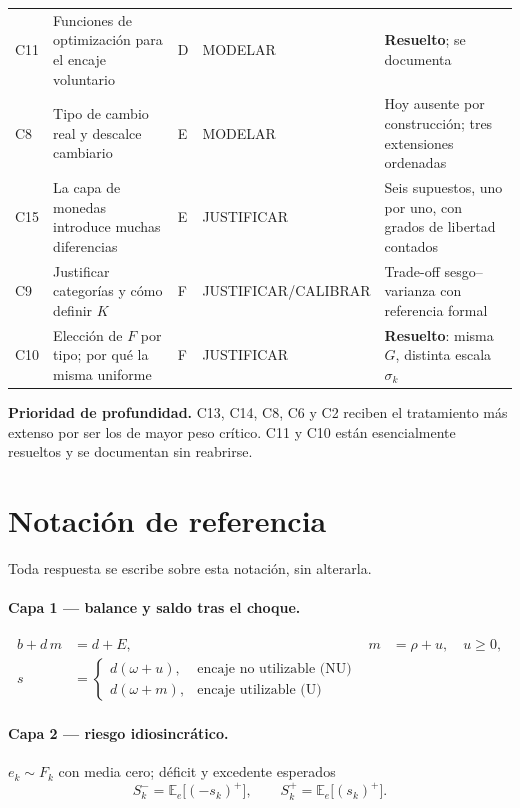 \documentclass[11pt]{article}
\newcommand{\E}{\mathbb{E}}
\theoremstyle{definition}
\begin{document}
\begin{longtable}{@{}p{0.6cm}p{5.6cm}p{1.3cm}p{2.5cm}p{4.2cm}@{}}
C11 & Funciones de optimizaci\'on para el encaje voluntario & D & MODELAR & \textbf{Resuelto}; se documenta \\
C8  & Tipo de cambio real y descalce cambiario & E & MODELAR & Hoy ausente por construcci\'on; tres extensiones ordenadas \\
C15 & La capa de monedas introduce muchas diferencias & E & JUSTIFICAR & Seis supuestos, uno por uno, con grados de libertad contados \\
C9  & Justificar categor\'ias y c\'omo definir $K$ & F & JUSTIFICAR/\allowbreak CALIBRAR & Trade-off sesgo--varianza con referencia formal \\
C10 & Elecci\'on de $F$ por tipo; por qu\'e la misma uniforme & F & JUSTIFICAR & \textbf{Resuelto}: misma $G$, distinta escala $\sigma_k$ \\
\bottomrule
\end{longtable}

\noindent\textbf{Prioridad de profundidad.} C13, C14, C8, C6 y C2 reciben el
tratamiento m\'as extenso por ser los de mayor peso cr\'itico. C11 y C10 est\'an
esencialmente resueltos y se documentan sin reabrirse.

\section{Notaci\'on de referencia}\label{sec:notacion}

Toda respuesta se escribe sobre esta notaci\'on, sin alterarla.

\paragraph{Capa 1 --- balance y saldo tras el choque.}
\begin{align}
b + d\,m &= d + E, & m &= \rho + u, \quad u\ge 0, \label{eq:balance}\\
s &= \begin{cases}
d(\omega+u), & \text{encaje no utilizable (NU)}\\
d(\omega+m), & \text{encaje utilizable (U)}
\end{cases} \label{eq:saldo}
\end{align}

\paragraph{Capa 2 --- riesgo idiosincr\'atico.} $e_k\sim F_k$ con media cero;
d\'eficit y excedente esperados
\begin{equation}
S^-_k=\E_e\big[(-s_k)^+\big],\qquad S^+_k=\E_e\big[(s_k)^+\big].
\label{eq:SpSm}
\end{equation}
\end{document}

